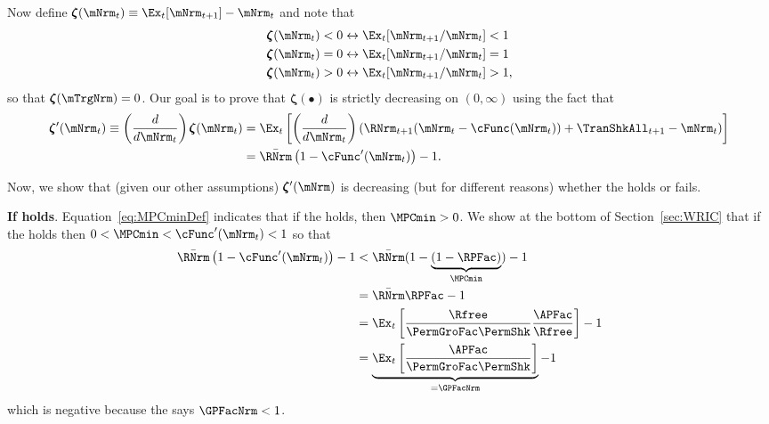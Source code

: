\documentclass[\econtexRoot/BufferStockTheory]{subfiles}
\begin{document}
Now define \providecommand{\difFunc}{\pmb{\zeta}} $\difFunc(\mNrm_t) \equiv 
\Ex_t[\mNrm_{t+1}] - \mNrm_t$ and note that
\begin{align}\label{eq:difNrmioEquiv}
  \difFunc(\mNrm_t) < 0 &\leftrightarrow \Ex_t[{\mNrm}_{t+1}/\mNrm_t] < 1 
                          \nonumber\\
  \difFunc(\mNrm_t) = 0 &\leftrightarrow \Ex_t[{\mNrm}_{t+1}/\mNrm_t] = 1\\
  \difFunc(\mNrm_t) > 0 &\leftrightarrow \Ex_t[{\mNrm}_{t+1}/\mNrm_t] > 
                          1,\nonumber
\end{align}
so that $\difFunc(\mTrgNrm)=0$. Our goal is to prove that $\difFunc(\bullet)$ is strictly 
decreasing on $(0,\infty)$ using the fact that
\begin{align}
  \difFunc^{\prime}(\mNrm_{t}) \equiv  \left( \frac{d}{d\mNrm_{t}}\right) \difFunc(\mNrm_t)  & = \Ex_{t}\left[
                                                                                               \left( \frac{d}{d\mNrm_{t}}\right) \left( 
                                                                                               {\RNrm}_{t+1}(\mNrm_{t}-\cFunc(\mNrm_{t}))+%
                                                                                               {\TranShkAll}_{t+1} - {\mNrm}_t\right) \right] \label{eq:difFuncmNrmDecreases} \\
                                                                                             & = \bar{\RNrm}\left(1-\cFunc^{\prime}({\mNrm}_t)\right) - 1.  \notag
\end{align}

Now, we show that (given our other assumptions) $\difFunc^{\prime}(\mNrm)$ is decreasing (but for different reasons) whether the {\RIC} holds or fails.

\textbf{If {\RIC} holds}. Equation~\eqref{eq:MPCminDef} indicates that if the {\RIC} holds, then $\MPCmin >0$.  We show at the bottom of Section~\ref{sec:WRIC} that if the {\RIC} holds then $0 < \MPCmin < \cFunc^{\prime}(\mNrm_{t}) < 1$ so that 
\begin{align*}
  \bar{\RNrm}\left(1-\cFunc^{\prime}({\mNrm}_t)\right) - 1 & <  \bar{\RNrm}(1-\underbrace{(1-\RPFac)}_{\MPCmin}) - 1  \\
                                                            & = \bar{\RNrm}\RPFac - 1 \\
                                                            & = \Ex_{t}\left[\frac{\Rfree}{\PermGroFac \PermShk}\frac{\APFac}{\Rfree}\right] - 1 \\
                                                            & = \underbrace{\Ex_{t}\left[\frac{\APFac}{\PermGroFac \PermShk}\right]}_{= \GPFacNrm} - 1 
\end{align*}
which is negative because the {\GICNrm} says $\GPFacNrm < 1$.  
\end{document}
